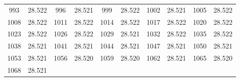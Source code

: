\documentclass[12pt]{ctexart}
\numberwithin{equation}{section}
\begin{document}
\begin{longtable}{cc|cc|cc|cc|cc}
    993      & 28.522   & 996      & 28.521   & 999      & 28.522   & 1002     & 28.521   & 1005     & 28.522   \\
    1008     & 28.522   & 1011     & 28.522   & 1014     & 28.522   & 1017     & 28.522   & 1020     & 28.522   \\
    1023     & 28.522   & 1026     & 28.522   & 1029     & 28.521   & 1032     & 28.522   & 1035     & 28.522   \\
    1038     & 28.521   & 1041     & 28.521   & 1044     & 28.521   & 1047     & 28.521   & 1050     & 28.521   \\
    1053     & 28.521   & 1056     & 28.520   & 1059     & 28.520   & 1062     & 28.521   & 1065     & 28.520   \\
    1068     & 28.521   &          &          &          &          &          &          &          &          \\
\end{longtable}
\end{document}
